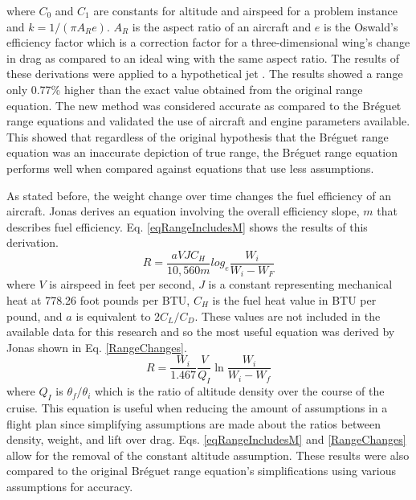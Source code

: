 where $C_0$ and $C_1$ are constants for altitude and airspeed for a problem instance and $k = 1/(\pi A_R e)$. $A_R$ is the aspect ratio of an aircraft and $e$ is the Oswald's efficiency factor which is a correction factor for a three-dimensional wing's change in drag as compared to an ideal wing with the same aspect ratio. The results of these derivations were applied to a hypothetical jet \cite{Jonas}. The results showed a range only 0.77\% higher than the exact value obtained from the original range equation. The new method was considered accurate as compared to the Br\'eguet range equations and validated the use of aircraft and engine parameters available. This showed that regardless of the original hypothesis that the Br\'eguet range equation was an inaccurate depiction of true range, the Br\'eguet range equation performs well when compared against equations that use less assumptions.\par
As stated before, the weight change over time changes the fuel efficiency of an aircraft. Jonas \cite{Jonas} derives an equation involving the overall efficiency slope, $m$ that describes fuel efficiency. Eq. \ref{eqRangeIncludesM} shows the results of this derivation.
\begin{equation}
    R = \dfrac{aVJC_H}{10,560m}log_e\dfrac{W_i}{W_i-W_F}
    \label{eqRangeIncludesM}
\end{equation}
where $V$ is airspeed in feet per second, $J$ is a constant representing mechanical heat at 778.26 foot pounds per BTU, $C_H$ is the fuel heat value in BTU per pound, and $a$ is equivalent to $2C_L/C_D$. These values are not included in the available data for this research and so the most useful equation was derived by Jonas \cite{Jonas} shown in Eq. \ref{RangeChanges}.
\begin{equation}
    R = \dfrac{W_i}{1.467}\dfrac{V}{Q_I}\ln\dfrac{W_i}{W_i-W_f}
    \label{RangeChanges}
\end{equation}
where $Q_I$ is $\theta_f/\theta_i$ which is the ratio of altitude density over the course of the cruise. This equation is useful when reducing the amount of assumptions in a flight plan since simplifying assumptions are made about the ratios between density, weight, and lift over drag. Eqs. \ref{eqRangeIncludesM} and \ref{RangeChanges} allow for the removal of the constant altitude assumption. These results were also compared to the original Br\'eguet range equation's simplifications using various assumptions for accuracy. \par
